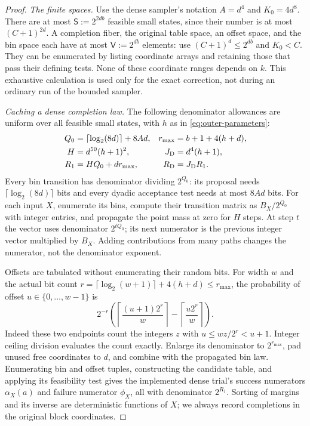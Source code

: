 \begin{proof}
\emph{The finite spaces.}
Use the dense sampler's notation $A=d^4$ and $K_0=4d^8$.
There are at most $\mathsf S:=2^{2db}$ feasible small states, since their
number is at most $(C+1)^{2d}$. A completion fiber, the original table
space, an offset space, and the bin space each have at most
$\mathsf V:=2^{db}$ elements: use $(C+1)^d\le2^{db}$ and $K_0<C$.
They can be enumerated by listing coordinate arrays and retaining those
that pass their defining tests. None of these coordinate ranges depends
on $k$. This exhaustive calculation is used only for the exact correction,
not during an ordinary run of the bounded sampler.

\emph{Caching a dense completion law.}
The following denominator allowances are uniform over all feasible small
states, with $h$ as in \eqref{eq:outer-parameters}:
\begin{align}
 Q_0&=\lceil\log_2(8d)\rceil+8Ad,
 &r_{\max}&=b+1+4(h+d),\nonumber\\
 H&=d^{50}(h+1)^2,
 &J_{\rm D}&=d^4(h+1),\nonumber\\
 R_1&=H Q_0+d r_{\max},
 &R_{\rm D}&=J_{\rm D}R_1.\label{eq:bit-schedule}
\end{align}
Every bin transition has denominator dividing $2^{Q_0}$: its proposal
needs $\lceil\log_2(8d)\rceil$ bits and every dyadic acceptance test needs
at most $8Ad$ bits. For each input $X$, enumerate its bins, compute their
transition matrix as $B_X/2^{Q_0}$ with integer entries, and propagate the
point mass at zero for $H$ steps. At step $t$ the vector uses denominator
$2^{tQ_0}$; its next numerator is the previous integer vector multiplied
by $B_X$. Adding contributions from many paths changes the numerator,
not the denominator exponent.

Offsets are tabulated without enumerating their random bits. For width
$w$ and the actual bit count
$r=\lceil\log_2(w+1)\rceil+4(h+d)\le r_{\max}$, the probability of offset
$u\in\{0,\ldots,w-1\}$ is
\begin{equation}\label{eq:offset-count}
 2^{-r}\left(
 \left\lceil\frac{(u+1)2^r}{w}\right\rceil
 -\left\lceil\frac{u2^r}{w}\right\rceil\right).
\end{equation}
Indeed these two endpoints count the integers $z$ with
$u\le wz/2^r<u+1$. Integer ceiling division evaluates the count exactly.
Enlarge its denominator to $2^{r_{\max}}$, pad unused free coordinates to
$d$, and combine with the propagated bin law. Enumerating bin and offset
tuples, constructing the candidate table, and applying its feasibility
test gives the implemented dense trial's success numerators $\alpha_X(a)$ and failure
numerator $\phi_X$, all with denominator $2^{R_1}$.
Sorting of margins and its inverse are deterministic functions of $X$;
we always record completions in the original block coordinates.


\end{proof}
